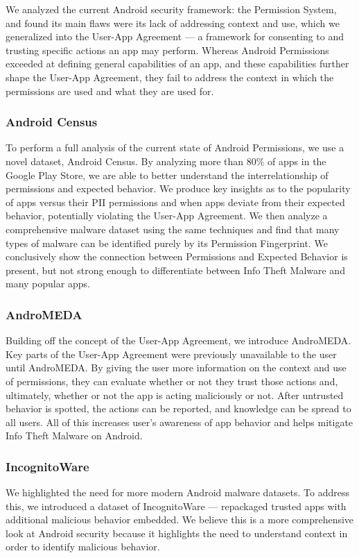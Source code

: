 \documentclass{acm_proc_article-sp}
\begin{document}
We analyzed the current Android security framework: the Permission System, and found its main flaws were its lack of addressing context and use, which we generalized into the User-App Agreement --- a framework for consenting to and trusting specific actions an app may perform. Whereas Android Permissions exceeded at defining general capabilities of an app, and these capabilities further shape the User-App Agreement, they fail to address the context in which the permissions are used and what they are used for.

\subsubsection{Android Census}
To perform a full analysis of the current state of Android Permissions, we use a novel dataset, Android Census. By analyzing more than 80\% of apps in the Google Play Store, we are able to better understand the interrelationship of permissions and expected behavior. We produce key insights as to the popularity of apps versus their PII permissions and when apps deviate from their expected behavior, potentially violating the User-App Agreement. We then analyze a comprehensive malware dataset using the same techniques and find that many types of malware can be identified purely by its Permission Fingerprint. We conclusively show the connection between Permissions and Expected Behavior is present, but not strong enough to differentiate between Info Theft Malware and many popular apps.

\subsubsection{AndroMEDA}
Building off the concept of the User-App Agreement, we introduce AndroMEDA. Key parts of the User-App Agreement were previously unavailable to the user until AndroMEDA. By giving the user more information on the context and use of permissions, they can evaluate whether or not they trust those actions and, ultimately, whether or not the app is acting maliciously or not. After untrusted behavior is spotted, the actions can be reported, and knowledge can be spread to all users. All of this increases user's awareness of app behavior and helps mitigate Info Theft Malware on Android.

\subsubsection{IncognitoWare}
We highlighted the need for more modern Android malware datasets. To address this, we introduced a dataset of IncognitoWare --- repackaged trusted apps with additional malicious behavior embedded. We believe this is a more comprehensive look at Android security because it highlights the need to understand context in order to identify malicious behavior.
\end{document}
